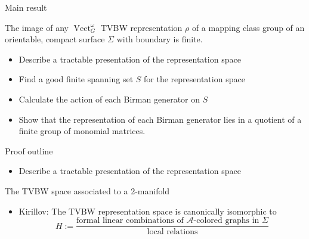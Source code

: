 \documentclass{beamer}
\DeclareMathOperator{\Vect}{Vect}
\begin{document}
\begin{frame}{Main result}
\begin{theorem}[G.]
The image of any $\Vect^\omega_G$ TVBW representation $\rho$ of a mapping class group of an orientable, compact surface $\Sigma$ with boundary is finite.
\end{theorem}
\begin{itemize}
  \item Describe a tractable presentation of  the representation space
  \item Find a good finite spanning set $S$ for the representation space
  \item Calculate the action of each Birman generator on $S$
  \item Show that the representation of each Birman generator lies in a quotient of a finite group of monomial matrices.  
\end{itemize}
\end{frame}

\begin{frame}{Proof outline}
\begin{itemize}
  \item Describe a tractable presentation of  the representation space
\end{itemize}
\end{frame}

\begin{frame}{The TVBW space associated to a 2-manifold}
  \begin{itemize}
    \item 
        Kirillov: The TVBW representation space is canonically isomorphic to
        \[
        H := \frac{\text{formal linear combinations of $\mathcal A$-colored graphs in $\Sigma$}  }
        {\text{local relations}}
       \]
  \end{itemize}

\end{frame}
\end{document}
